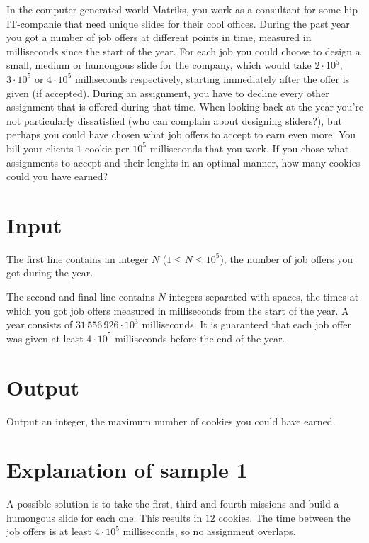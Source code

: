 In the computer-generated world Matriks, you work as a consultant for some hip IT-companie that need unique slides for their cool offices.
During the past year you got a number of job offers at different points in time, measured in milliseconds since the start of the year.
For each job you could choose to design a small, medium or humongous slide for the company, which would take $2 \cdot 10^5$, $3 \cdot 10^5$ or $4 \cdot 10^5$ milliseconds respectively, starting immediately after the offer is given (if accepted).
During an assignment, you have to decline every other assignment that is offered during that time.
When looking back at the year you're not particularly dissatisfied (who can complain about designing sliders?), but perhaps you could have chosen what job offers to accept to earn even more.
You bill your clients $1$ cookie per $10^5$ milliseconds that you work.
If you chose what assignments to accept and their lenghts in an optimal manner, how many cookies could you have earned?

\section*{Input}
The first line contains an integer $N$ ($1 \le N \le 10^5$), the number of job offers you got during the year.

The second and final line contains $N$ integers separated with spaces, the times at which you got job offers measured in milliseconds from the start of the year.
A year consists of $31\,556\,926 \cdot 10^3$ milliseconds.
It is guaranteed that each job offer was given at least $4 \cdot 10^5$ milliseconds before the end of the year.

\section*{Output}
Output an integer, the maximum number of cookies you could have earned.

\section*{Explanation of sample 1}
A possible solution is to take the first, third and fourth missions and build a humongous slide for each one.
This results in $12$ cookies.
The time between the job offers is at least $4 \cdot 10^5$ milliseconds, so no assignment overlaps.
